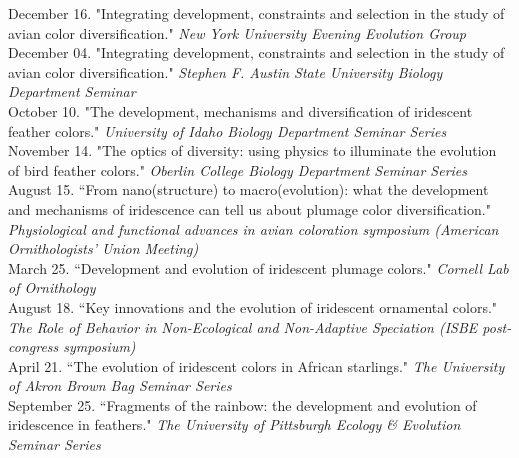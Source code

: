 \documentclass[10pt]{article}
\newcommand{\years}[1]{\marginnote{\raggedleft\scriptsize #1}}
\begin{document}
\years{2015} December 16. "Integrating development, constraints and selection in the study of avian color diversification." \emph{New York University Evening Evolution Group}\\

\years{} December 04. "Integrating development, constraints and selection in the study of avian color diversification." \emph{Stephen F. Austin State University Biology Department Seminar}\\

\years{2014} October 10. "The development, mechanisms and diversification of iridescent feather colors." \emph{University of Idaho Biology Department Seminar Series}\\

\years{2013} November 14. "The optics of diversity: using physics to illuminate the evolution of bird feather colors." \emph{Oberlin College Biology Department Seminar Series}\\

\years{} August 15. “From nano(structure) to macro(evolution): what the development and mechanisms of
iridescence can tell us about plumage color diversification." \emph{Physiological and functional advances in avian coloration symposium (American Ornithologists' Union Meeting)}\\

\years{} March 25. “Development and evolution of iridescent plumage colors." \emph{Cornell Lab of Ornithology}\\

\years{2012} August 18. “Key innovations and the evolution of iridescent ornamental colors." \emph{The Role of Behavior in Non-Ecological and Non-Adaptive Speciation (ISBE post-congress symposium)}\\

\years{} April 21. “The evolution of iridescent colors in African starlings." \emph{The University of Akron Brown Bag Seminar Series}\\

\years{2011} September 25. “Fragments of the rainbow: the development and evolution of iridescence in feathers." \emph{The University of Pittsburgh Ecology \& Evolution Seminar Series} 



\end{document}
